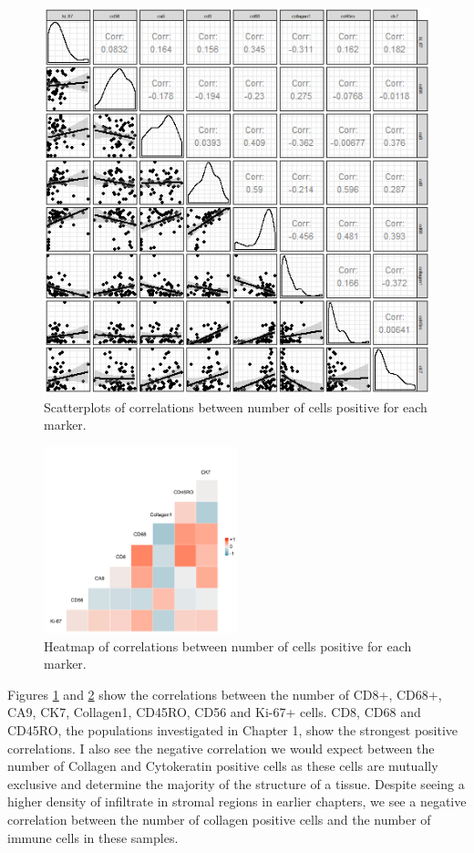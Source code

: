 \begin{figure}
    \centering
    \includegraphics{Chapter4/figs/Britroc_cell_correlation2.png}
    \caption{Scatterplots of correlations between number of cells positive for each marker.}
    \label{fig:britroc_corr_scatt}
\end{figure}

\begin{figure}
    \centering
    \includegraphics[width=0.5\textwidth]{Chapter2/Figs/Raster/correlation_britroc.png}
    \caption{Heatmap of correlations between number of cells positive for each marker.}
    \label{fig:britroc_corr_heat}
\end{figure}

Figures \ref{fig:britroc_corr_scatt} and \ref{fig:britroc_corr_heat} show the correlations between the number of CD8+, CD68+, CA9, CK7, Collagen1, CD45RO, CD56 and Ki-67+ cells. CD8, CD68 and CD45RO, the populations investigated in Chapter 1, show the strongest positive correlations. I also see the negative correlation we would expect between the number of Collagen and Cytokeratin positive cells as these cells are mutually exclusive and determine the majority of the structure of a tissue. Despite seeing a higher density of infiltrate in stromal regions in earlier chapters, we see a negative correlation between the number of collagen positive cells and the number of immune cells in these samples.

